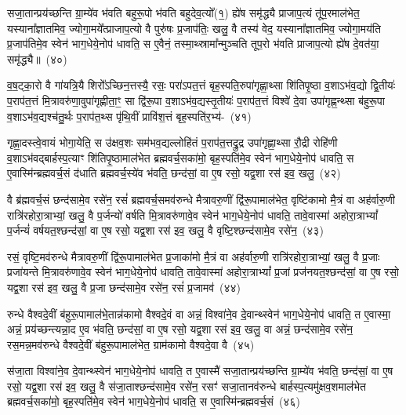 सजा॒तान्प्रय॑च्छन्ति ग्रा॒म्ये॑व भ॑वति बहुरू॒पो भ॑वति बहुदेव॒त्यो᳚(१॒) ह्ये॑ष समृ॑द्ध्यै प्राजाप॒त्यं तू॑प॒रमा\-ल॑भेत॒ यस्याना᳚ज्ञातमिव॒ ज्योगा॒मये᳚त्प्राजाप॒त्यो वै पुरु॑षः प्र॒जा\-प॑तिः॒ खलु॒ वै तस्य॑ वेद॒ यस्याना᳚ज्ञातमिव॒ ज्योगा॒मय॑ति प्र॒जा\-प॑तिमे॒व स्वेन॑ भाग॒धेये॒नोप॑ धावति॒ स ए॒वैनं॒ तस्मा॒थ्स्रामा᳚न्मुञ्चति तूप॒रो भ॑वति प्राजाप॒त्यो ह्ये॑ष दे॒वत॑या॒ समृ॑द्ध्यै॥~(४०)

{\anuvakamend[{अ॒स्मा॒ इन्द्र॑मे॒वैष स॑जा॒ता विश्वा॑ने॒व दे॒वान्थ्स्वेन॑ भाग॒धेये॒नोप॑ धावति॒ त ए॒वास्मै᳚ प्राजाप॒त्यो हि त्रीणि॑ च}]}%

व॒ष॒ट्का॒रो वै गा॑यत्रि॒यै शिरो᳚\-ऽच्छिन॒त्तस्यै॒ रसः॒ परा॑\-ऽपत॒त्तं बृह॒स्पति॒रुपा॑गृह्णा॒थ्सा शि॑तिपृ॒ष्ठा व॒शा\-ऽभ॑व॒द्यो द्वि॒तीयः॑ प॒राप॑त॒त्तं मि॒त्रावरु॑णा॒वुपा॑गृह्णीता॒ꣳ॒ सा द्वि॑रू॒पा व॒शा\-ऽभ॑व॒द्यस्तृ॒तीयः॑ प॒राप॑त॒त्तं विश्वे॑ दे॒वा उपा॑गृह्ण॒न्थ्सा ब॑हुरू॒पा व॒शा\-ऽभ॑व॒द्यश्च॑तु॒र्थः प॒राप॑त॒थ्स पृ॑थि॒वीं प्रावि॑श॒त्तं बृह॒स्पति॑र॒भ्य॑-~(४१)

गृह्णा॒दस्त्वे॒वायं भोगा॒येति॒ स उ॑क्षव॒शः सम॑भव॒द्यल्लोहि॑तं प॒राप॑त॒त्तद्रु॒द्र उपा॑गृह्णा॒थ्सा रौ॒द्री रोहि॑णी व॒शा\-ऽभ॑व\-द्बार्\mbox{}हस्प॒त्याꣳ शि॑तिपृ॒ष्ठामाल॑भेत ब्रह्मवर्च॒सका॑मो॒ बृह॒स्पति॑मे॒व स्वेन॑ भाग॒धेये॒नोप॑ धावति॒ स ए॒वास्मि॑न्ब्रह्म\-वर्च॒सं द॑धाति ब्रह्मवर्च॒स्ये॑व भ॑वति॒ छन्द॑सां॒ वा ए॒ष रसो॒ यद्व॒शा रस॑ इव॒ खलु॒~(४२)

वै ब्र॑ह्मवर्च॒सं छन्द॑सामे॒व रसे॑न॒ रसं॑ ब्रह्मवर्च॒समव॑\-रुन्धे मैत्रावरु॒णीं द्वि॑रू॒पामा\-ल॑भेत॒ वृष्टि॑कामो मै॒त्रं वा अह॑र्वारु॒णी रात्रि॑रहोरा॒त्राभ्यां॒ खलु॒ वै प॒र्जन्यो॑ वर्\mbox{}षति मि॒त्रावरु॑णावे॒व स्वेन॑ भाग॒धेये॒नोप॑ धावति॒ तावे॒वास्मा॑ अहोरा॒त्रा\-भ्यां᳚ प॒र्जन्यं॑ वर्\mbox{}षयत॒श्छन्द॑सां॒ वा ए॒ष रसो॒ यद्व॒शा रस॑ इव॒ खलु॒ वै वृष्टि॒श्छन्द॑सामे॒व रसे॑न॒~(४३)

रसं॒ वृष्टि॒मव॑\-रुन्धे मैत्रावरु॒णीं द्वि॑रू॒पामाल॑भेत प्र॒जाका॑मो मै॒त्रं वा अह॑र्वारु॒णी रात्रि॑रहोरा॒त्राभ्यां॒ खलु॒ वै प्र॒जाः प्रजा॑यन्ते मि॒त्रावरु॑णावे॒व स्वेन॑ भाग॒धेये॒नोप॑ धावति॒ तावे॒वास्मा॑ अहोरा॒त्रा\-भ्यां᳚ प्र॒जां प्रज॑नयत॒श्छन्द॑सां॒ वा ए॒ष रसो॒ यद्व॒शा रस॑ इव॒ खलु॒ वै प्र॒जा छन्द॑सामे॒व रसे॑न॒ रसं॑ प्र॒जामव॑~(४४)

रुन्धे वैश्वदे॒वीं ब॑हुरू॒पामाल॑भे॒तान्न॑कामो वैश्वदे॒वं वा अन्नं॒ विश्वा॑ने॒व दे॒वान्थ्स्वेन॑ भाग॒धेये॒नोप॑ धावति॒ त ए॒वास्मा॒ अन्नं॒ प्रय॑च्छन्त्यन्ना॒द ए॒व भ॑वति॒ छन्द॑सां॒ वा ए॒ष रसो॒ यद्व॒शा रस॑ इव॒ खलु॒ वा अन्नं॒ छन्द॑सामे॒व रसे॑न॒ रस॒मन्न॒मव॑\-रुन्धे वैश्वदे॒वीं ब॑हुरू॒पामा\-ल॑भेत॒ ग्राम॑कामो वैश्वदे॒वा वै~(४५)

स॑जा॒ता विश्वा॑ने॒व दे॒वान्थ्स्वेन॑ भाग॒धेये॒नोप॑ धावति॒ त ए॒वास्मै॑ सजा॒तान्प्रय॑च्छन्ति ग्रा॒म्ये॑व भ॑वति॒ छन्द॑सां॒ वा ए॒ष रसो॒ यद्व॒शा रस॑ इव॒ खलु॒ वै स॑जा॒ताश्छन्द॑सामे॒व रसे॑न॒ रसꣳ॑ सजा॒तानव॑\-रुन्धे बार्\mbox{}हस्प॒त्यमु॑क्षव॒शमाल॑भेत ब्रह्मवर्च॒सका॑मो॒ बृह॒स्पति॑मे॒व स्वेन॑ भाग॒धेये॒नोप॑ धावति॒ स ए॒वास्मि॑न्ब्रह्मवर्च॒सं~(४६)


